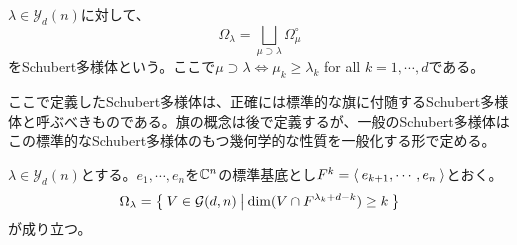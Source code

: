 \documentclass{ltjsreport}
\begin{document}
\begin{defin}[標準的な旗に付随するShubert多様体]
  $\lambda\in\mathcal{Y}_d(n)$に対して、
  \[
  \Omega_\lambda=\bigsqcup_{\mu\supset\lambda}\Omega^\circ_\mu
  \]
  をSchubert多様体という。ここで$\mu\supset\lambda\Leftrightarrow \mu_k\geq \lambda_k$ for all $k=1,\cdots,d$である。
\end{defin}

ここで定義したSchubert多様体は、正確には標準的な旗に付随するSchubert多様体と呼ぶべきものである。旗の概念は後で定義するが、一般のSchubert多様体はこの標準的なSchubert多様体のもつ幾何学的な性質を一般化する形で定める。

\begin{prop}\label{schubert_var}
  $\lambda\in\mathcal{Y}_d(n)$とする。$e_1,\cdots,e_n$を$\mathbb{C}^n$の標準基底とし$F^k=\langle\:e_{k+1},\cdots,e_n\:\rangle$とおく。
  \[
  \Omega_{\lambda}=\left\{\:V\in\mathcal{G}(d,n)\:\middle|\:\dim(V\cap F^{\lambda_k+d-k})\geq k\:\right\}  
  \]
  が成り立つ。
\end{prop}
\end{document}
